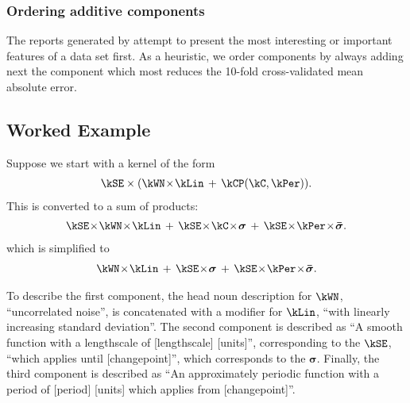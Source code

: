 

\subsubsection{Ordering additive components}

The reports generated by \procedurename{} attempt to present the most interesting or important features of a data set first.
As a heuristic, we order components by always adding next the component which most reduces the 10-fold cross-validated mean absolute error.



\subsection{Worked Example}

Suppose we start with a kernel of the form
\begin{align}
\kSE \times (\kWN \kerntimes \kLin \kernplus \kCP(\kC, \kPer)).
\end{align}
This is converted to a sum of products:
\begin{align}
\kSE \kerntimes \kWN \kerntimes \kLin \kernplus \kSE \kerntimes \kC \kerntimes \boldsymbol{\sigma} \kernplus \kSE \kerntimes \kPer \kerntimes \boldsymbol{\bar\sigma}.
\end{align}
which is simplified to
\begin{align}
\kWN \kerntimes \kLin \kernplus \kSE \kerntimes \boldsymbol{\sigma} \kernplus \kSE \kerntimes \kPer \kerntimes \boldsymbol{\bar\sigma}.
\end{align}

To describe the first component, the head noun description for $\kWN$, ``uncorrelated noise'', is concatenated with a modifier for $\kLin$, ``with linearly increasing standard deviation''.
%
The second component is described as ``A smooth function with a lengthscale of [lengthscale] [units]'', corresponding to the $\kSE$, ``which applies until [changepoint]'', which corresponds to the $\boldsymbol{\sigma}$.
%
Finally, the third component is described as ``An approximately periodic function with a period of [period] [units] which applies from [changepoint]''.

